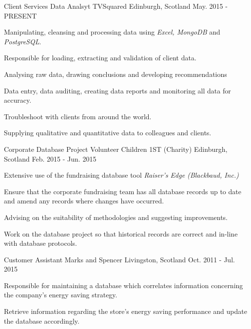 \begin{cventries}
  \cventry
    {Client Services Data Analsyt}
    {TVSquared}
    {Edinburgh, Scotland}
    {May. 2015 - PRESENT}
    {
      \begin{cvitems}
        \item {Manipulating, cleansing and processing data using \textit{Excel, MongoDB} and \textit{PostgreSQL}.}
        \item {Responsible for loading, extracting and validation of client data.}
        \item {Analysing raw data, drawing conclusions and developing recommendations}
        \item {Data entry, data auditing, creating data reports and monitoring all data for accuracy.}
        \item {Troubleshoot with clients from around the world.}
        \item {Supplying qualitative and quantitative data to colleagues and clients.}
      \end{cvitems}
    }
  \cventry
    {Corporate Database Project Volunteer}
    {Children 1ST (Charity)}
    {Edinburgh, Scotland}
    {Feb. 2015 - Jun. 2015}
    {
      \begin{cvitems}
        \item {Extensive use of the fundraising database tool \textit{Raiser's Edge (Blackbaud, Inc.)}}
        \item {Ensure that the corporate fundraising team has all database records up to date and amend any records where changes have occurred.}
        \item {Advising on the suitability of methodologies and suggesting improvements.}
        \item {Work on the database project so that historical records are correct and in-line with database protocols.}
      \end{cvitems} 
    }
  \cventry
    {Customer Assistant}
    {Marks and Spencer}
    {Livingston, Scotland}
    {Oct. 2011 - Jul. 2015}
    {
      \begin{cvitems}
        \item {Responsible for maintaining a database which correlates information concerning the company's energy saving strategy.}
        \item {Retrieve information regarding the store's energy saving performance and update the database accordingly.}
      \end{cvitems}
    }
\end{cventries}
